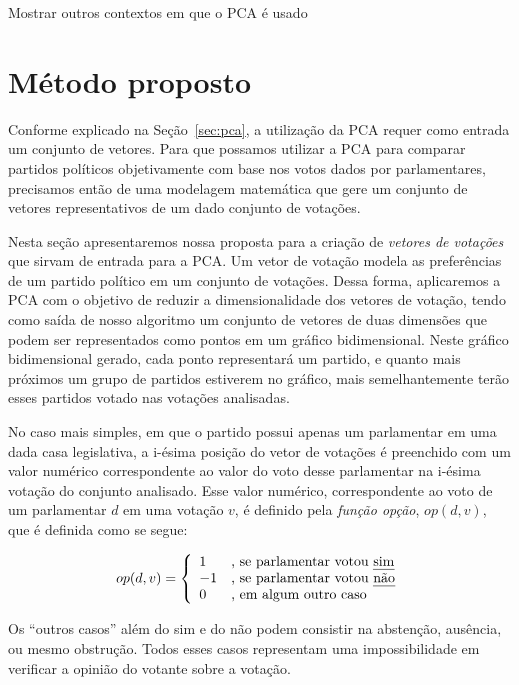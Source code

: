\documentclass[a4paper, 12pt]{article}
\newcommand\Leo[1]{\nb{Leo}{#1}}
\begin{document}
Mostrar outros contextos em que o PCA é usado

\section{Método proposto}
\label{sec:metodo}

Conforme explicado na Seção~\ref{sec:pca}, a utilização da PCA requer como entrada um conjunto de vetores. Para que possamos utilizar a PCA para comparar partidos políticos objetivamente com base nos votos dados por parlamentares, precisamos então de uma modelagem matemática que gere um conjunto de vetores representativos de um dado conjunto de votações.

Nesta seção apresentaremos nossa proposta para a criação de \emph{vetores de votações} que sirvam de entrada para a PCA. Um vetor de votação modela as preferências de um partido político em um conjunto de votações. Dessa forma, aplicaremos a PCA com o objetivo de reduzir a dimensionalidade dos vetores de votação, tendo como saída de nosso algoritmo um conjunto de vetores de duas dimensões que podem ser representados como pontos em um gráfico bidimensional. Neste gráfico bidimensional gerado, cada ponto representará um partido, e quanto mais próximos um grupo de partidos estiverem no gráfico, mais semelhantemente terão esses partidos votado nas votações analisadas.

No caso mais simples, em que o partido possui apenas um parlamentar em uma dada casa legislativa, a i-ésima posição do vetor de votações é preenchido com um valor numérico correspondente ao valor do voto desse parlamentar na i-ésima votação do conjunto analisado. Esse valor numérico, correspondente ao voto de um parlamentar $d$ em uma votação $v$, é definido pela \emph{função opção}, $op(d,v)$, que é definida como se segue:

\[
   op(d,v) = \left\{ 
     \begin{array}{l l}
        1 & \text{, se parlamentar votou \emph{sim}} \\
       -1 & \text{, se parlamentar votou \emph{não}} \\
        0 & \text{, em algum outro caso} 
     \end{array} \right.
\]

Os ``outros casos'' além do sim e do não podem consistir na abstenção, ausência, ou mesmo obstrução. Todos esses casos representam uma impossibilidade em verificar a opinião do votante sobre a votação.

\Leo{TODO: enumerar suposições/premissas}
\end{document}
